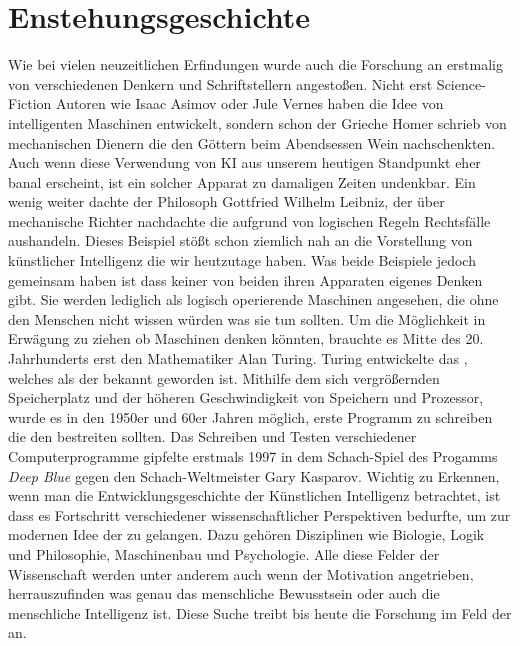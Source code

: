 \documentclass[12pt]{report}
\begin{document}
    \chapter{Enstehungsgeschichte}
    Wie bei vielen neuzeitlichen Erfindungen wurde auch die Forschung an 
    erstmalig von verschiedenen Denkern und Schriftstellern angestoßen.
    Nicht erst Science-Fiction Autoren wie Isaac Asimov oder Jule Vernes haben die Idee von intelligenten Maschinen
    entwickelt, sondern schon der Grieche Homer schrieb von mechanischen Dienern die den Göttern beim Abendsessen
    Wein nachschenkten. Auch wenn diese Verwendung von KI aus unserem heutigen Standpunkt
    eher banal erscheint, ist ein solcher Apparat zu damaligen Zeiten undenkbar.
    Ein wenig weiter dachte der Philosoph Gottfried Wilhelm Leibniz, der über mechanische Richter nachdachte
    die aufgrund von logischen Regeln Rechtsfälle aushandeln.
    Dieses Beispiel stößt schon ziemlich nah an die Vorstellung von künstlicher Intelligenz die wir heutzutage haben.
    Was beide Beispiele jedoch gemeinsam haben ist dass keiner von beiden ihren Apparaten eigenes Denken
    gibt. Sie werden lediglich als logisch operierende Maschinen angesehen, die ohne den Menschen nicht wissen würden
    was sie tun sollten.
    Um die Möglichkeit in Erwägung zu ziehen ob Maschinen denken könnten,
    brauchte es Mitte des 20. Jahrhunderts erst den Mathematiker Alan Turing.
    Turing entwickelte das , welches als der  bekannt geworden ist.
    Mithilfe dem sich vergrößernden Speicherplatz und der höheren Geschwindigkeit von Speichern und Prozessor,
    wurde es in den 1950er und 60er Jahren möglich, erste Programm zu schreiben die den  bestreiten sollten.
    Das Schreiben und Testen verschiedener Computerprogramme gipfelte erstmals 1997 in dem Schach-Spiel des Progamms \emph{Deep Blue}
    gegen den Schach-Weltmeister Gary Kasparov.
    Wichtig zu Erkennen, wenn man die Entwicklungsgeschichte der Künstlichen Intelligenz betrachtet, ist dass es Fortschritt verschiedener
    wissenschaftlicher Perspektiven bedurfte, um zur modernen Idee der  zu gelangen.
    Dazu gehören Disziplinen wie Biologie, Logik und Philosophie, Maschinenbau und Psychologie.
    Alle diese Felder der Wissenschaft werden unter anderem auch wenn der Motivation angetrieben, herrauszufinden was genau
    das menschliche Bewusstsein oder auch die menschliche Intelligenz ist.
    Diese Suche treibt bis heute die Forschung im Feld der  an.
\end{document}
